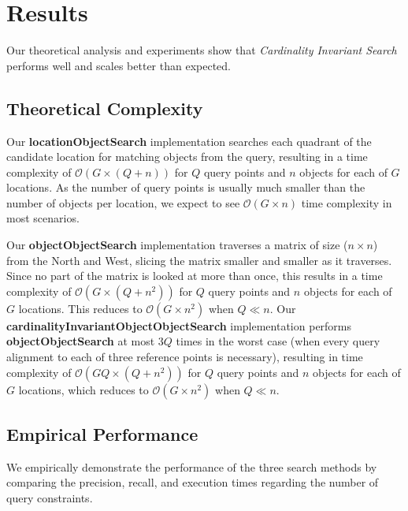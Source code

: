 \section{Results}
\label{section:results}

Our theoretical analysis and experiments show that \textit{Cardinality Invariant Search} performs well and scales better than expected.

\subsection{Theoretical Complexity}
Our \textbf{locationObjectSearch} implementation searches each quadrant of the candidate location for matching objects from the query, resulting in a time complexity of $\mathcal{O}(G \times (Q + n))$ for $Q$ query points and $n$ objects for each of $G$ locations. 
As the number of query points is usually much smaller than the number of objects per location, we expect to see $\mathcal{O}(G\times n)$ time complexity in most scenarios.

Our \textbf{objectObjectSearch} implementation traverses a matrix of size ($n \times n$) from the North and West, slicing the matrix smaller and smaller as it traverses. 
Since no part of the matrix is looked at more than once, this results in a time complexity of $\mathcal{O}(G \times (Q + n^2))$ for $Q$ query points and $n$ objects for each of $G$ locations. 
This reduces to $\mathcal{O}(G\times n^2)$ when $Q \ll n$. 
Our \textbf{cardinalityInvariantObjectObjectSearch} implementation performs \textbf{objectObjectSearch} at most $3Q$ times in the worst case (when every query alignment to each of three reference points is necessary), resulting in time complexity of $\mathcal{O}(GQ \times (Q + n^2))$ for $Q$ query points and $n$ objects for each of $G$ locations, which reduces to $\mathcal{O}(G \times n^2)$ when $Q \ll n$. 


\subsection{Empirical Performance}
We empirically demonstrate the performance of the three search methods by comparing the precision, recall, and execution times regarding the number of query constraints. 

